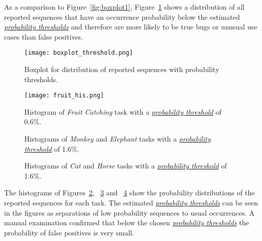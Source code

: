 As a comparison to Figure~\ref{fig:boxplot1}, Figure~\ref{fig:boxplot2} shows a distribution of all reported sequences that have an occurrence probability below the estimated \hyperref[def:probability_threshold]{\textit{probability thresholds}} and therefore are more likely to be true bugs or unusual use cases than false positives.

\begin{figure}[hbtp]
    \centering
    \texttt{[image: boxplot\_threshold.png]}
    \caption[Boxplot for distribution of reported sequences with probability thresholds]{\label{fig:boxplot2}Boxplot for distribution of reported sequences with probability thresholds.}
\end{figure}

\begin{figure}[hbtp]
    \centering
    \texttt{[image: fruit\_his.png]}
    \caption[Histogram for probability distribution of \textit{Fruit Catching} task]{\label{fig:fruit_his}Histogram of \textit{Fruit Catching} task with a \hyperref[def:probability_threshold]{\textit{probability threshold}} of 0.6\%.}
\end{figure}

\begin{figure}[hbtp]%
    \centering
    \qquad
    \caption[Histograms of \textit{Monkey} and \textit{Elephant} tasks]{\label{fig:his1}Histograms of \textit{Monkey} and \textit{Elephant} tasks with a  \hyperref[def:probability_threshold]{\textit{probability threshold}} of 1.6\%.}%
\end{figure}

\begin{figure}[hbtp]%
    \centering
    \qquad
    \caption[Histograms of \textit{Cat} and \textit{Horse} tasks]{\label{fig:his2}Histograms of \textit{Cat} and \textit{Horse} tasks with a  \hyperref[def:probability_threshold]{\textit{probability threshold}} of 1.6\%.}%
\end{figure}

The histograms of Figures~\ref{fig:fruit_his}, ~\ref{fig:his1} and ~\ref{fig:his2} show the probability distributions of the reported sequences for each task. The estimated \hyperref[def:probability_threshold]{\textit{probability thresholds}} can be seen in the figures as separations of low probability sequences to usual occurrences. A manual examination confirmed that below the chosen  \hyperref[def:probability_threshold]{\textit{probability thresholds}} the probability of false positives is very small.


